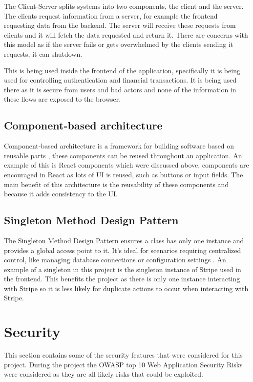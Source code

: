 \documentclass[]{project_report}
\begin{document}
The Client-Server splits systems into two components, the client and the server. The clients request information from a server, for example the frontend requesting data from the backend. The server will receive these requests from clients and it will fetch the data requested and return it. There are concerns with this model as if the server fails or gets overwhelmed by the clients sending it requests, it can shutdown.

This is being used inside the frontend of the application, specifically it is being used for controlling authentication and financial transactions. It is being used there as it is secure from users and bad actors and none of the information in these flows are exposed to the browser. 


\subsection{Component-based architecture}

Component-based architecture is a framework for building software based on reusable parts \cite{component_architecture}, these components can be reused throughout an application. An example of this is React components which were discussed above, components are encouraged in React as lots of UI is reused, such as buttons or input fields. The main benefit of this architecture is the reusability of these components and because it adds consistency to the UI.


\subsection{Singleton Method Design Pattern}

The Singleton Method Design Pattern ensures a class has only one instance and provides a global access point to it. It’s ideal for scenarios requiring centralized control, like managing database connections or configuration settings \cite{singleton}. An example of a singleton in this project is the singleton instance of Stripe used in the frontend. This benefits the project as there is only one instance interacting with Stripe so it is less likely for duplicate actions to occur when interacting with Stripe.

\section{Security}

This section contains some of the security features that were considered for this project. During the project the OWASP top 10 Web Application Security Risks \cite{owasp_10} were considered as they are all likely risks that could be exploited.
\end{document}
